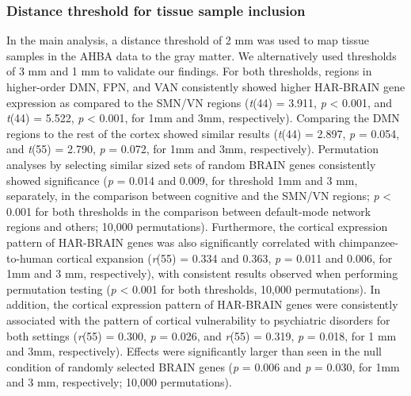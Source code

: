 \begin{refsection}
\subsubsection*{Distance threshold for tissue sample inclusion}
In the main analysis, a distance threshold of 2 mm was used to map tissue samples in the AHBA data to the gray matter. We alternatively used thresholds of 3 mm and 1 mm to validate our findings. For both thresholds, regions in higher-order DMN, FPN, and VAN consistently showed higher HAR-BRAIN gene expression as compared to the SMN/VN regions (\textit{t}(44) = 3.911, \textit{p} < 0.001, and \textit{t}(44) = 5.522, \textit{p} < 0.001, for 1mm and 3mm, respectively). Comparing the DMN regions to the rest of the cortex showed similar results (\textit{t}(44) = 2.897, \textit{p} = 0.054, and \textit{t}(55) = 2.790, \textit{p} = 0.072, for 1mm and 3mm, respectively). Permutation analyses by selecting similar sized sets of random BRAIN genes consistently showed significance (\textit{p} = 0.014 and 0.009, for threshold 1mm and 3 mm, separately, in the comparison between cognitive and the SMN/VN regions; \textit{p} < 0.001 for both thresholds in the comparison between default-mode network regions and others; 10,000 permutations). Furthermore, the cortical expression pattern of HAR-BRAIN genes was also significantly correlated with chimpanzee-to-human cortical expansion (\textit{r}(55) = 0.334 and 0.363, \textit{p} = 0.011 and 0.006, for 1mm and 3 mm, respectively), with consistent results observed when performing permutation testing (\textit{p} < 0.001 for both thresholds, 10,000 permutations). In addition, the cortical expression pattern of HAR-BRAIN genes were consistently associated with the pattern of cortical vulnerability to psychiatric disorders for both settings (\textit{r}(55) = 0.300, \textit{p} = 0.026, and \textit{r}(55) = 0.319, \textit{p} = 0.018, for 1 mm and 3mm, respectively). Effects were significantly larger than seen in the null condition of randomly selected BRAIN genes (\textit{p} = 0.006 and \textit{p} = 0.030, for 1mm and 3 mm, respectively; 10,000 permutations).


\end{refsection}
